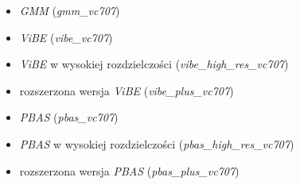 \begin{enumerate}
{\begin{itemize}
			\item{\textit{GMM} (\textit{gmm\_vc707})}
			\item{\textit{ViBE} (\textit{vibe\_vc707})}
			\item{\textit{ViBE} w wysokiej rozdzielczości (\textit{vibe\_high\_res\_vc707})}
			\item{rozszerzona wersja \textit{ViBE} (\textit{vibe\_plus\_vc707})}
			\item{\textit{PBAS} (\textit{pbas\_vc707})}
			\item{\textit{PBAS}  w wysokiej rozdzielczości (\textit{pbas\_high\_res\_vc707})}
			\item{rozszerzona wersja \textit{PBAS} (\textit{pbas\_plus\_vc707})}
		\end{itemize}	
}
\end{enumerate}